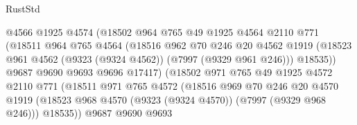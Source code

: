 \begin{lexlean}{RustStd}
\begin{coremodule}
                                @4566
                                @1925
                                @4574
                                (@18502
                                  @964
                                  @765
                                  @49
                                  @1925
                                  @4564
                                  @2110
                                  @771
                                  (@18511
                                    @964
                                    @765
                                    @4564
                                    (@18516
                                      @962
                                      @70
                                      @246
                                      @20
                                      @4562
                                      @1919
                                      (@18523
                                        @961
                                        @4562
                                        (@9323 (@9324 @4562))
                                        (@7997 (@9329 @961 @246)))
                                      @18535))
                                  @9687
                                  @9690
                                  @9693
                                  @9696
                                  @17417)
                                (@18502
                                  @971
                                  @765
                                  @49
                                  @1925
                                  @4572
                                  @2110
                                  @771
                                  (@18511
                                    @971
                                    @765
                                    @4572
                                    (@18516
                                      @969
                                      @70
                                      @246
                                      @20
                                      @4570
                                      @1919
                                      (@18523
                                        @968
                                        @4570
                                        (@9323 (@9324 @4570))
                                        (@7997 (@9329 @968 @246)))
                                      @18535))
                                  @9687
                                  @9690
                                  @9693

\end{coremodule}
\end{lexlean}
